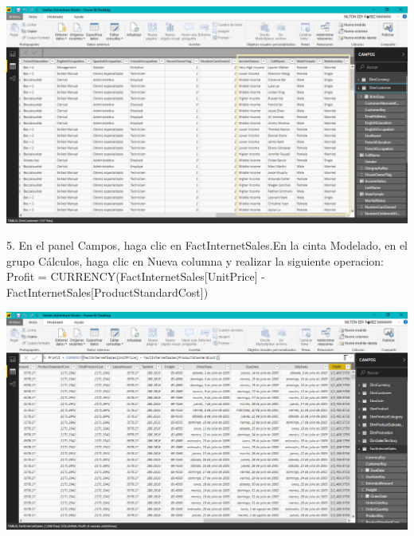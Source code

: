\begin{center}
\includegraphics[width=15cm]{./Imagenes/img6} 
\end{center}



\begin{itemize}
5. En el panel Campos, haga clic en FactInternetSales.En la cinta Modelado, en el grupo Cálculos, haga clic en Nueva columna y realizar la siguiente operacion:
Profit = CURRENCY(FactInternetSales[UnitPrice] -
FactInternetSales[ProductStandardCost])
\end{itemize}

\begin{center}
\includegraphics[width=15cm]{./Imagenes/img8} 
\end{center}